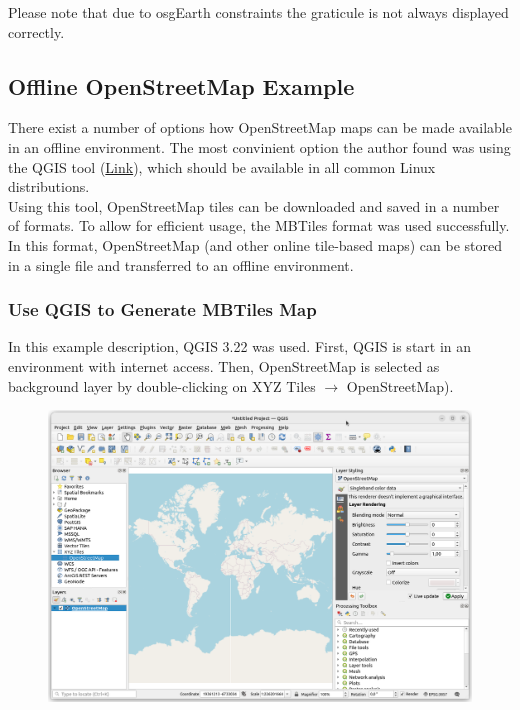 Please note that due to osgEarth constraints the graticule is not always displayed correctly. \\

\subsection{Offline OpenStreetMap Example}

There exist a number of options how OpenStreetMap maps can be made available in an offline environment. The most convinient option the author found was using the QGIS tool (\href{https://www.qgis.org/}{Link}), which should be available in all common Linux distributions. \\

Using this tool, OpenStreetMap tiles can be downloaded and saved in a number of formats. To allow for efficient usage, the MBTiles format was used successfully. In this format, OpenStreetMap (and other online tile-based maps) can be stored in a single file and transferred to an offline environment.

\subsubsection{Use QGIS to Generate MBTiles Map}

In this example description, QGIS 3.22 was used. First, QGIS is start in an environment with internet access. Then, OpenStreetMap is selected as background layer by double-clicking on XYZ Tiles $\rightarrow$ OpenStreetMap).

\begin{figure}[H]
    \hspace*{-2cm}
    \includegraphics[width=18cm,frame]{figures/qgis_osm1.png}
\end{figure}

